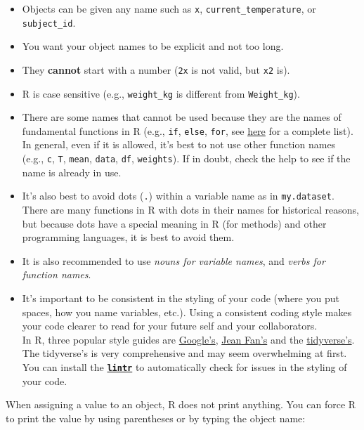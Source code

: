 \documentclass[
]{book}
\providecommand{\tightlist}{%
  \setlength{\itemsep}{0pt}\setlength{\parskip}{0pt}}
\begin{document}
\begin{itemize}
\tightlist
\item
  Objects can be given any name such as \texttt{x}, \texttt{current\_temperature}, or
  \texttt{subject\_id}.
\item
  You want your object names to be explicit and not too long.
\item
  They \textbf{cannot} start with a number (\texttt{2x} is not valid, but \texttt{x2} is).
\item
  R is case sensitive
  (e.g., \texttt{weight\_kg} is different from \texttt{Weight\_kg}).
\item
  There are some names that
  cannot be used because they are the names of fundamental functions in R (e.g., \texttt{if}, \texttt{else}, \texttt{for}, see
  \href{https://stat.ethz.ch/R-manual/R-devel/library/base/html/Reserved.html}{here} for a complete list). In general, even if it is allowed, it's best to not use other function names (e.g., \texttt{c}, \texttt{T}, \texttt{mean}, \texttt{data}, \texttt{df}, \texttt{weights}). If in doubt, check the help to see if the name is already in use.
\item
  It's also best to
  avoid dots (\texttt{.}) within a variable name as in \texttt{my.dataset}. There are many
  functions in R with dots in their names for historical reasons, but because dots have a special meaning in R (for methods) and other programming languages, it is best to avoid them.
\item
  It is also recommended to use \emph{nouns for variable names}, and
  \emph{verbs for function names}.
\item
  It's important to be consistent in the styling of your code (where you put spaces, how you name variables, etc.). Using a consistent
  coding style makes your code clearer to read for your future self and your
  collaborators.\\
  In R, three popular style guides
  are
  \href{https://google.github.io/styleguide/Rguide.xml}{Google's},
  \href{http://jef.works/R-style-guide/}{Jean Fan's} and
  the \href{http://style.tidyverse.org/}{tidyverse's}. The tidyverse's is very comprehensive
  and may seem overwhelming at first. You can install the
  \href{https://github.com/jimhester/lintr}{\textbf{\texttt{lintr}}} to automatically check for issues
  in the styling of your code.
\end{itemize}

When assigning a value to an object, R does not print anything. You can force R to print the value by using parentheses or by typing the object name:
\end{document}
